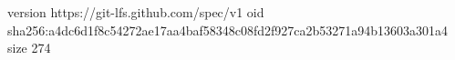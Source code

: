 version https://git-lfs.github.com/spec/v1
oid sha256:a4dc6d1f8c54272ae17aa4baf58348c08fd2f927ca2b53271a94b13603a301a4
size 274
